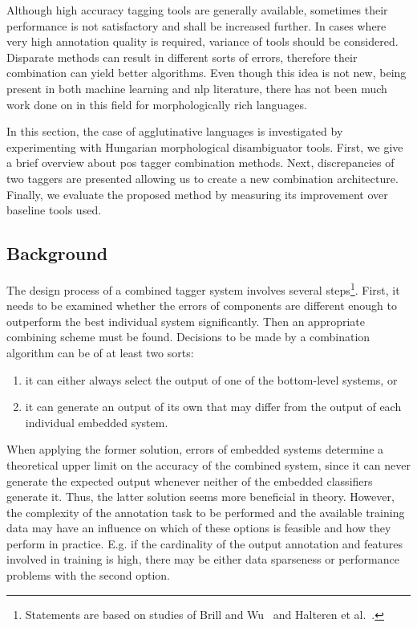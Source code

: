 Although high accuracy tagging tools are generally available, sometimes their performance is not satisfactory and shall be increased further.
In cases where very high annotation quality is required, variance of tools should be considered.
Disparate methods can result in different sorts of errors, therefore their combination can yield better algorithms.
Even though this idea is not new, being present in both machine learning and \acrshort{nlp} literature, there has not been much work done on in this field for morphologically rich languages. 

In this section, the case of agglutinative languages is investigated by experimenting with Hungarian morphological disambiguator tools.
First, we give a brief overview about \acrshort{pos} tagger combination methods.
Next, discrepancies of two taggers are presented allowing us to create a new combination architecture.
Finally, we evaluate the proposed method by measuring its improvement over baseline tools used.

\subsection{Background}

The design process of a combined tagger system involves several steps\footnote{Statements are based on studies of Brill and Wu~\cite{Brill1998} and Halteren et al.~\cite{Halteren2001}.}.
First, it needs to be examined whether the errors of components are different enough to outperform the best individual system significantly.
Then an appropriate combining scheme must be found.
Decisions to be made by a combination algorithm can be of at least two sorts: 
\begin{enumerate}
  \item it can either always select the output of one of the bottom-level systems, or 
  \item it can generate an output of its own that may differ from the output of each individual embedded system. 
\end{enumerate}

When applying the former solution, errors of embedded systems determine a theoretical upper limit on the accuracy of the combined system, since it can never generate the expected output whenever neither of the embedded classifiers generate it.
Thus, the latter solution seems more beneficial in theory.
However, the complexity of the annotation task to be performed and the available training data may have an influence on which of these options is feasible and how they perform in practice.
E.g. if the cardinality of the output annotation and features involved in training is high, there may be either data sparseness or performance problems with the second option.

